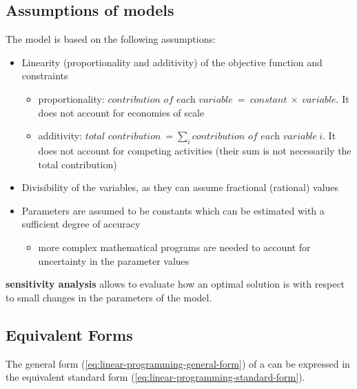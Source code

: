 \documentclass[english]{article}
\begin{document}
\subsection{Assumptions of \LP models}

The \LP model is based on the following assumptions:

\begin{itemize}
  \item Linearity (proportionality and additivity) of the objective function and constraints
        \begin{itemize}[label=\(\rightarrow\)]
          \item proportionality: \( \textit{contribution of each variable} \ = \ \textit{constant} \ \times \ \textit{variable} \). It does not account for economies of scale
          \item additivity: \(\textit{total contribution} \ =\sum_i \textit{contribution of each variable} \ i\). It does not account for competing activities (their sum is not necessarily the total contribution)
        \end{itemize}
  \item Divisibility of the variables, as they can assume fractional (rational) values
  \item Parameters are assumed to be constants which can be estimated with a sufficient degree of accuracy
        \begin{itemize}[label=\(\rightarrow\)]
          \item more complex mathematical programs are needed to account for uncertainty in the parameter values
        \end{itemize}
\end{itemize}

\LP \textbf{sensitivity analysis} allows to evaluate how  an optimal solution is with respect to small changes in the parameters of the model. %

\subsection{Equivalent Forms}

The general form (\ref{eq:linear-programming-general-form}) of a \LP can be expressed in the equivalent standard form (\ref{eq:linear-programming-standard-form}).
\end{document}
